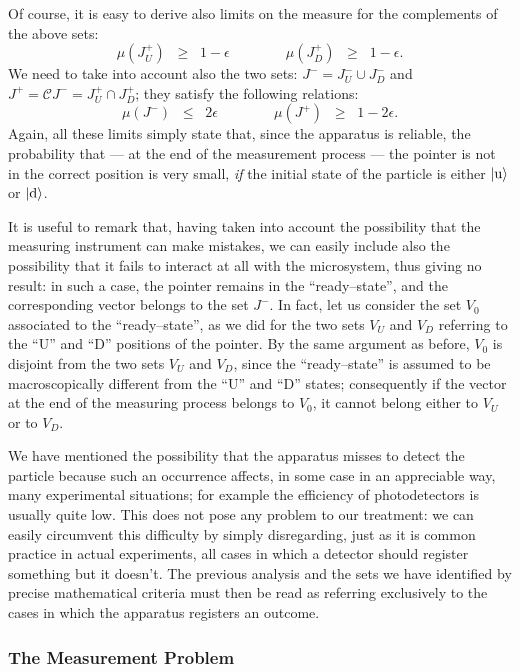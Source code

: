 \documentclass[10pt,a4paper]{article}
\begin{document}
Of course, it is easy to derive also limits on the measure for the
complements of the above sets:
\[
\mu(J^{+}_{U}) \;\; \geq \;\; 1 - \epsilon \qquad\qquad
\mu(J^{+}_{D}) \;\; \geq \;\; 1 - \epsilon.
\]
We need to take into account also the two sets: $J^{-} = J^{-}_{U}
\cup J^{-}_{D}$ and $J^{+} = {\mathcal C}J^{-} = J^{+}_{U} \cap
J^{+}_{D}$; they satisfy the following relations:
\[
\mu(J^{-}) \;\; \leq \;\; 2\epsilon \qquad\qquad \mu(J^{+}) \;\;
\geq \;\; 1 - 2\epsilon.
\]
Again, all these limits simply state that, since the apparatus is
reliable, the probability that --- at the end of the measurement
process --- the pointer is not in the correct position is very
small, {\it if} the initial state of the particle is either
$|\makebox{u}\rangle$ or $|\makebox{d}\rangle$.

It is useful to remark that, having taken into account the
possibility that the measuring instrument can make mistakes, we
can easily include also the possibility that it fails to interact
at all with the microsystem, thus giving no result: in such a
case, the pointer remains in the ``ready--state'', and the
corresponding vector belongs to the set $J^{-}$. In fact, let us
consider the set $V_{0}$ associated to the ``ready--state'', as we
did for the two  sets $V_{U}$ and $V_{D}$ referring to the ``U''
and ``D''  positions of the pointer. By the same argument as
before,  $V_{0}$ is disjoint from the two sets $V_{U}$ and
$V_{D}$, since the ``ready--state'' is assumed to be
macroscopically different from the ``U'' and ``D'' states;
consequently if the vector at the end of the measuring process
belongs to $V_{0}$, it cannot belong either to $V_{U}$ or to
$V_{D}$.

We have mentioned the possibility that the apparatus misses to
detect the particle because such an occurrence affects, in some
case in an appreciable way, many experimental situations; for
example the efficiency of photodetectors is usually quite low.
This does not pose any problem to our treatment: we can easily
circumvent this difficulty by simply disregarding, just as it is
common practice in actual experiments, all cases in which a
detector should register something but it doesn't. The previous
analysis and the sets we have identified by precise mathematical
criteria must then be read as referring exclusively to the cases
in which the apparatus registers an outcome.


\subsubsection{The Measurement Problem} \label{sec225}
\end{document}
